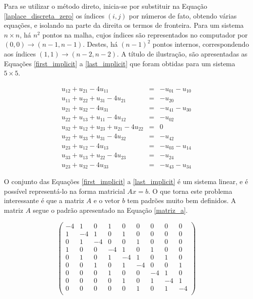 \documentclass[journal]{IEEEtran}
\begin{document}
Para se utilizar o método direto, inicia-se por substituir na Equação \ref{laplace_discreta_zero} os índices $(i,j)$ por números de fato, obtendo várias equações, e isolando na parte da direita os termos de fronteira. Para um sistema $n\times n$, há $n^2$ pontos na malha, cujos índices são representados no computador por $(0,0)\rightarrow (n-1,n-1)$. Destes, há $(n-1)^2$ pontos internos, correspondendo aos índices $(1,1)\rightarrow (n-2,n-2)$. A título de ilustração, são apresentadas as Equações \ref{first_implicit} a \ref{last_implicit} que foram obtidas para um sistema $5\times 5$.

\begin{eqnarray}
u_{12}+u_{21} -4u_{11}& = & -u_{01}-u_{10} \label{first_implicit} \\
u_{11}+u_{22}+u_{31}-4u_{21}& =& -u_{20} \\
u_{21}+u_{32}-4u_{31}&=&-u_{41}-u_{30} \\
u_{22}+u_{13}+u_{11}-4u_{12}&=&-u_{02} \\
u_{32}+u_{12}+u_{23}+u_{21}-4u_{22}&=&0 \\
u_{22}+u_{33}+u_{31}-4u_{32}&=&-u_{42} \\
u_{23}+u_{12}-4u_{13}&=&-u_{03}-u_{14} \\
u_{33}+u_{13}+u_{22}-4u_{23}&=&-u_{24} \\
u_{23}+u_{32}-4u_{33}&=&-u_{43}-u_{34} \label{last_implicit}
\end{eqnarray}

O conjunto das Equações \ref{first_implicit} a \ref{last_implicit} é um sistema linear, e é possível representá-lo na forma matricial $Ax = b$. O que torna este problema interessante é que a matriz $A$ e o vetor $b$ tem padrões muito bem definidos. A matriz $A$ segue o padrão apresentado na Equação \ref{matriz_a}.

\begin{equation}
\left( \begin{array}{ccccccccc}
-4 & 1 & 0 & 1 & 0 & 0 & 0 & 0 & 0 \\ %
1 & -4 & 1 & 0 & 1 & 0 & 0 & 0 & 0 \\ %
0 & 1 & -4 & 0 & 0 & 1 & 0 & 0 & 0 \\ %
1 & 0 & 0 & -4 & 1 & 0 & 1 & 0 & 0 \\ %
0 & 1 & 0 & 1 & -4 & 1 & 0 & 1 & 0 \\ %
0 & 0 & 1 & 0 & 1 & -4 & 0 & 0 & 1 \\ %
0 & 0 & 0 & 1 & 0 & 0 & -4 & 1 & 0 \\ %
0 & 0 & 0 & 0 & 1 & 0 & 1 & -4 & 1 \\ %
0 & 0 & 0 & 0 & 0 & 1 & 0 & 1 & -4 \\ %
\end{array} \right) \label{matriz_a}
\end{equation}
\end{document}
